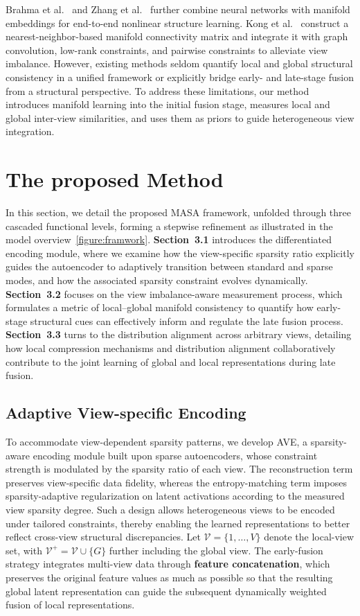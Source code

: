 \documentclass[10pt, journal, compsoc]{IEEEtran}
\begin{document}
Brahma et al.\ \cite{110brahma2015deep} and Zhang et al.\ \cite{111zhang2020deep} further combine neural networks with manifold embeddings for end-to-end nonlinear structure learning. Kong et al.\ \cite{112kong2025robust} construct a nearest-neighbor-based manifold connectivity matrix and integrate it with graph convolution, low-rank constraints, and pairwise constraints to alleviate view imbalance. However, existing methods seldom quantify local and global structural consistency in a unified framework or explicitly bridge early- and late-stage fusion from a structural perspective. To address these limitations, our method introduces manifold learning into the initial fusion stage, measures local and global inter-view similarities, and uses them as priors to guide heterogeneous view integration.

\section{The proposed Method}
In this section, we detail the proposed MASA framework, unfolded through three cascaded functional levels, forming a stepwise refinement as illustrated in the model overview~\ref{figure:framwork}. \textbf{Section~3.1} introduces the differentiated encoding module, where we examine how the view-specific sparsity ratio explicitly guides the autoencoder to adaptively transition between standard and sparse modes, and how the associated sparsity constraint evolves dynamically. \textbf{Section~3.2} focuses on the view imbalance-aware measurement process, which formulates a metric of local--global manifold consistency to quantify how early-stage structural cues can effectively inform and regulate the late fusion process. \textbf{Section~3.3} turns to the distribution alignment across arbitrary views, detailing how local compression mechanisms and distribution alignment collaboratively contribute to the joint learning of global and local representations during late fusion.

\subsection{Adaptive View-specific Encoding}
\label{sec:ave}
To accommodate view-dependent sparsity patterns, we develop AVE, a sparsity-aware encoding module built upon sparse autoencoders, whose constraint strength is modulated by the sparsity ratio of each view. The reconstruction term preserves view-specific data fidelity, whereas the entropy-matching term imposes sparsity-adaptive regularization on latent activations according to the measured view sparsity degree. Such a design allows heterogeneous views to be encoded under tailored constraints, thereby enabling the learned representations to better reflect cross-view structural discrepancies.
Let $\mathcal{V}=\{1,\dots,V\}$ denote the local-view set, with $\mathcal{V}^{+}=\mathcal{V}\cup\{G\}$ further including the global view. The early-fusion strategy integrates multi-view data through \textbf{feature concatenation}, which preserves the original feature values as much as possible so that the resulting global latent representation can guide the subsequent dynamically weighted fusion of local representations.
\end{document}
